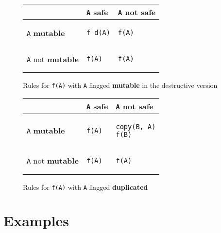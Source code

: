 \documentclass[12pt,a4paper]{article}
\newcommand{\cl}[1]{\texttt{#1}}
\newcommand{\bang}{ \textbf{ mutable } }
\newcommand{\safe}{ \textbf{ safe } }
\newcommand{\dupl}{ \textbf{ duplicated } }
\begin{document}
\begin{figure}[!ht]
\begin{tabular}{|p{5.5cm}|p{5.5cm}|p{6cm}|}
\hline
             & \cl{A} \safe & \cl{A} not \safe \\ \hline
\cl{A} \bang  &
\begin{lstlisting}
f_d(A)
\end{lstlisting} & \begin{lstlisting}
f(A)
\end{lstlisting} \\ \hline
\cl{A} not \bang & \begin{lstlisting}
f(A)
\end{lstlisting} & \begin{lstlisting}
f(A)
\end{lstlisting} \\ \hline
\end{tabular}
\caption{Rules for \cl{f(A)} with \cl{A} flagged \bang in the destructive version}
\end{figure}


\begin{figure}[!ht]
\begin{tabular}{|p{5.5cm}|p{5.5cm}|p{6cm}|}
\hline
             & \cl{A} \safe & \cl{A} not \safe \\ \hline
\cl{A} \bang  &
\begin{lstlisting}
f(A)
\end{lstlisting} & \begin{lstlisting}
copy(B, A)
f(B)
\end{lstlisting} \\ \hline
\cl{A} not \bang & \begin{lstlisting}
f(A)
\end{lstlisting} & \begin{lstlisting}
f(A)
\end{lstlisting} \\ \hline
\end{tabular}
\caption{Rules for \cl{f(A)} with \cl{A} flagged \dupl}
\end{figure}






\newpage
\section{Examples}
\end{document}
